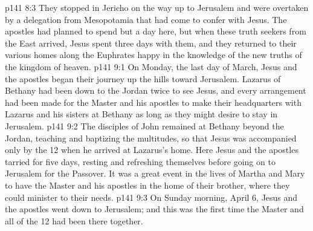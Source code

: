 \vs p141 8:3 They stopped in Jericho on the way up to Jerusalem and were overtaken by a delegation from Mesopotamia that had come to confer with Jesus. The apostles had planned to spend but a day here, but when these truth seekers from the East arrived, Jesus spent three days with them, and they returned to their various homes along the Euphrates happy in the knowledge of the new truths of the kingdom of heaven.
\vs p141 9:1 On Monday, the last day of March, Jesus and the apostles began their journey up the hills toward Jerusalem. Lazarus of Bethany had been down to the Jordan twice to see Jesus, and every arrangement had been made for the Master and his apostles to make their headquarters with Lazarus and his sisters at Bethany as long as they might desire to stay in Jerusalem.
\vs p141 9:2 The disciples of John remained at Bethany beyond the Jordan, teaching and baptizing the multitudes, so that Jesus was accompanied only by the 12 when he arrived at Lazarus’s home. Here Jesus and the apostles tarried for five days, resting and refreshing themselves before going on to Jerusalem for the Passover. It was a great event in the lives of Martha and Mary to have the Master and his apostles in the home of their brother, where they could minister to their needs.
\vs p141 9:3 On Sunday morning, April 6, Jesus and the apostles went down to Jerusalem; and this was the first time the Master and all of the 12 had been there together.
\quizlink
